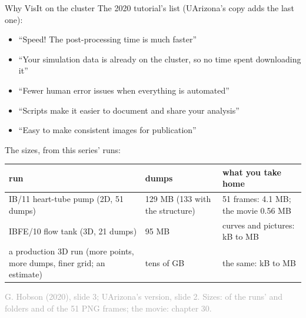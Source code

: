 \documentclass[aspectratio=169,11pt]{beamer}
\newcommand{\sourcecredit}[1]{\vfill\begin{flushright}\tiny\textcolor{DarkGray}{#1}\end{flushright}}
\begin{document}
\begin{frame}{Why VisIt on the cluster}
\label{fr:why}
\footnotesize
The 2020 tutorial's list (UArizona's copy adds the last one):
\begin{itemize}\setlength{\itemsep}{1pt}
  \item ``Speed! The post-processing time is much faster''
  \item ``Your simulation data is already on the cluster, so no time spent downloading it''
  \item ``Fewer human error issues when everything is automated''
  \item ``Scripts make it easier to document and share your analysis''
  \item ``Easy to make consistent images for publication''
\end{itemize}
\vspace{1mm}
The sizes, from this series' runs:

\scriptsize
\begin{tabular}{@{}L{0.42\textwidth}L{0.18\textwidth}L{0.32\textwidth}@{}}
\toprule
run & dumps & what you take home \\
\midrule
IB/11 heart-tube pump (2D, 51 dumps) & 129 MB (133 with the structure) & 51 frames: 4.1 MB; the movie 0.56 MB \\
IBFE/10 flow tank (3D, 21 dumps) & 95 MB & curves and pictures: kB to MB \\
a production 3D run (more points, more dumps, finer grid; an estimate) & tens of GB & the same: kB to MB \\
\bottomrule
\end{tabular}
\sourcecredit{G. Hobson (2020), slide 3; UArizona's version, slide 2. Sizes: \code{du -sh} of the runs' \code{viz\_IB2d} and \code{viz\_IB3d} folders and of the 51 PNG frames; the movie: chapter 30.}
\end{frame}
\end{document}
